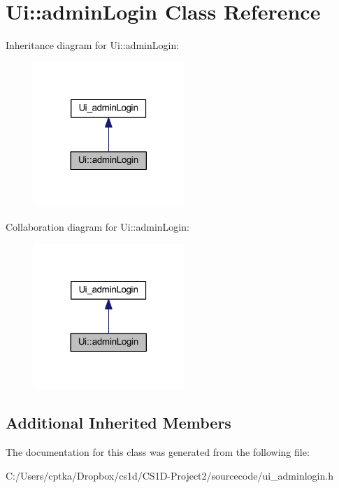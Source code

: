 \hypertarget{class_ui_1_1admin_login}{}\section{Ui\+:\+:admin\+Login Class Reference}
\label{class_ui_1_1admin_login}


Inheritance diagram for Ui\+:\+:admin\+Login\+:
\nopagebreak
\begin{figure}[H]
\begin{center}
\leavevmode
\includegraphics[width=161pt]{class_ui_1_1admin_login__inherit__graph}
\end{center}
\end{figure}


Collaboration diagram for Ui\+:\+:admin\+Login\+:
\nopagebreak
\begin{figure}[H]
\begin{center}
\leavevmode
\includegraphics[width=161pt]{class_ui_1_1admin_login__coll__graph}
\end{center}
\end{figure}
\subsection*{Additional Inherited Members}


The documentation for this class was generated from the following file\+:\begin{DoxyCompactItemize}
\item 
C\+:/\+Users/cptka/\+Dropbox/cs1d/\+C\+S1\+D-\/\+Project2/sourcecode/ui\+\_\+adminlogin.\+h\end{DoxyCompactItemize}
